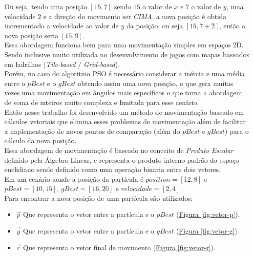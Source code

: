 Ou seja, tendo uma posição $[15, 7]$ sendo $15$ o valor de $x$ e $7$ o valor de $y$,
uma velocidade $2$ e a direção do movimento ser \textit{CIMA}, a nova posição é obtida incrementado a velocidade ao valor de $y$ da posição, ou seja $[15, 7+2]$, então a nova posição seria $[15, 9]$.\\
%
Essa abordagem funciona bem para uma movimentação simples em espaços 2D. Sendo inclusive muito utilizada no desenvolvimento de jogos com mapas baseados em ladrilhos (\textit{Tile-based} / \textit{Grid-based}).\\
\indent Porém, no caso do algoritmo PSO é necessário considerar a inércia e uma média entre o $pBest$ e o $gBest$ obtendo assim uma nova posição, o que gera muitas vezes uma movimentação em ângulos mais específicos o que torna a abordagem de soma de inteiros muito complexa e limitada para esse cenário.\\
\indent Então nesse trabalho foi desenvolvido um método de movimentação baseado em cálculos vetoriais que elimina esses problemas de movimentação além de facilitar a implementação de novos pontos de comparação (além do $pBest$ e $gBest$) para o cálculo da nova posição.\\
\indent Essa abordagem de movimentação é baseado no conceito de \textit{Produto Escalar} definido pela Álgebra Linear, e representa o produto interno padrão do espaço euclidiano sendo definido como uma operação binaria entre dois vetores.\\
\noindent Em um cenário aonde a posição da partícula é $position=[12,8]$ e $pBest=[10, 15]$, $gBest=[16,20]$ e $velocidade=[2,4]$.\\
\noindent Para encontrar a nova posição de uma partícula são utilizados:
\begin{itemize}
\item $\vec p$ Que representa o vetor entre a partícula e o $pBest$ 
(\hyperref[fig:vetor-p]{Figura \ref{fig:vetor-p}}).
\item $\vec g$ Que representa o vetor entre a partícula e o $gBest$ 
(\hyperref[fig:vetor-g]{Figura \ref{fig:vetor-g}}).
\item $\vec r$ Que representa o vetor final de movimento
(\hyperref[fig:vetor-r]{Figura \ref{fig:vetor-r}}).
\end{itemize}

